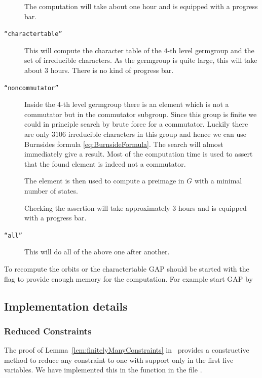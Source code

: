 \documentclass[a4paper,11pt]{amsart}
\begin{document}
\begin{description}
		      The computation will take about one hour and is equipped with a progress bar.
   \item [\texttt{``charactertable''}] This will compute the character table of 
          the $4$-th level germgroup and the set of irreducible characters. 
		      As the germgroup is quite large, this
		      will take about $3$ hours. There is no kind of progress bar.
   \item [\texttt{``noncommutator''}] Inside the $4$-th level germgroup there is
          an element which is not a commutator but in the commutator subgroup.
          Since this group is finite we could in principle search by brute force
          for a commutator. 
          Luckily there are only $3106$ irreducible characters in this group and
          hence we can use Burnsides formula \eqref{eq:BurnsideFormula}. 
          The search will almost immediately give a result. Most of the
          computation time is used to assert that the found element is indeed
          not a commutator.
		      
		      The element is then used to compute a preimage in $G$ with a minimal 
		      number of states.

		      Checking the assertion will take approximately $3$ hours and is equipped 
		      with a progress bar. 
  \item [\texttt{``all''}] This will do all of the above one after another.		      
   \end{description}
To recompute the orbits or the charactertable GAP should be 
started with the  flag
to provide enough memory for the computation. For example start GAP by 


\subsection{Implementation details}
\label{sec:gap_details}
\subsubsection{Reduced Constraints}
The proof of Lemma~\ref{lem:finitelyManyConstraints} in~\cite{Lysenok-Miasnikov-Ushakov:QuadraticEquationsInGrig} 
provides a constructive method to reduce any constraint to one with support
only in the first five variables. 
We have implemented this in the function  in the file
.
\end{document}
